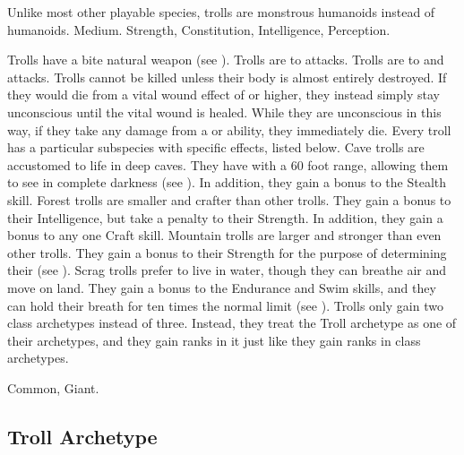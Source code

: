    Unlike most other playable species, trolls are monstrous humanoids instead of humanoids.
   Medium.
    Strength,  Constitution,  Intelligence,  Perception.
  \begin{itemize}
     Trolls have a bite natural weapon (see ).
     Trolls are \impervious to \atPoison attacks.
     Trolls are \vulnerable to \atAcid and \atFire attacks.
     Trolls cannot be killed unless their body is almost entirely destroyed.
      If they would die from a vital wound effect of  or higher, they instead simply stay unconscious until the vital wound is healed.
      While they are unconscious in this way, if they take any damage from a \atAcid or \atFire ability, they immediately die.
     Every troll has a particular subspecies with specific effects, listed below.
       Cave trolls are accustomed to life in deep caves.
      They have  with a 60 foot range, allowing them to see in complete darkness (see ).
      In addition, they gain a  bonus to the Stealth skill.
       Forest trolls are smaller and crafter than other trolls.
      They gain a  bonus to their Intelligence, but take a  penalty to their Strength.
      In addition, they gain a  bonus to any one Craft skill.
       Mountain trolls are larger and stronger than even other trolls.
      They gain a  bonus to their Strength for the purpose of determining their  (see ).
       Scrag trolls prefer to live in water, though they can breathe air and move on land.
      They gain a  bonus to the Endurance and Swim skills, and they can hold their breath for ten times the normal limit (see ).
     Trolls only gain two class archetypes instead of three.
      Instead, they treat the Troll archetype as one of their archetypes, and they gain ranks in it just like they gain ranks in class archetypes.
  \end{itemize}
   Common, Giant.

  \subsection{Troll Archetype}

